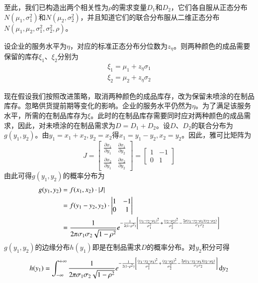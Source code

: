 至此，我们已构造出两个相关性为$\rho$的需求变量$D_1$和$D_2$，它们各自服从正态分布$N(\mu_1,\sigma_1^2)$和$N(\mu_2,\sigma_2^2)$，并且知道它们的联合分布服从二维正态分布$N(\mu_1,\mu_2,\sigma_1^2,\sigma_2^2,\rho)$。

设企业的服务水平为$\eta$，对应的标准正态分布分位数为$z_\eta$。则两种颜色的成品需要保留的库存$\xi_1$、$\xi_2$分别为
\begin{align}
\xi_1 = \mu_1 + z_\eta\sigma_1 \label{eq:成品库存1_相关性}\\
\xi_2 = \mu_2 + z_\eta\sigma_2 \label{eq:成品库存2_相关性}
\end{align}

现在假设我们按照改进策略，取消两种颜色的成品库存，改为保留未喷涂的在制品库存。忽略供货提前期等变化的影响。企业的服务水平仍然为$\eta$。为了满足该服务水平，所需的在制品库存为$\xi$。此时的在制品库存需要同时应对两种颜色的成品需求，因此，对未喷涂的在制品需求为$D=D_1+D_2$。设$D$、$D_2$的联合分布为$g(y_1,y_2)$。由$y_1=x_1+x_2,y_2=x_2$得$x_1=y_1-y_2,x_2=y_2$。因此，雅可比矩阵为
\[
J = \begin{bmatrix}
\frac{\partial x_1}{\partial y_1} & \frac{\partial x_1}{\partial y_2} \\
\frac{\partial x_2}{\partial y_1} & \frac{\partial x_2}{\partial y_2}
\end{bmatrix} = \begin{bmatrix}
1 & -1 \\
0 & 1
\end{bmatrix}
\]
由此可得$g(y_1,y_2)$的概率分布为
\begin{align}
g(y_1,y_2) &= f(x_1,x_2)\cdot\left|J\right| \notag\\
&= f(y_1-y_2,y_2)\cdot
\begin{vmatrix}
1 & -1 \\
0 & 1
\end{vmatrix} \notag\\
&= \frac{1}{2\pi\sigma_1\sigma_2\sqrt{1-\rho^2}}e^{-\frac{1}{2(1-\rho^2)}\left[\frac{(y_1-y_2-\mu_1)^2}{\sigma_1^2}+\frac{(y_2-\mu_2)^2}{\sigma_2^2}-\frac{2\rho(y_1-y_2-\mu_1)(y_2-\mu_2)}{\sigma_1\sigma_2}\right]}
\label{eq:新联合分布_二维正态}
\end{align}
$g(y_1,y_2)$的边缘分布$h(y_1)$即是在制品需求$D$的概率分布。对$y_2$积分可得
\begin{equation}
h(y_1) = \int_{-\infty}^{+\infty}\frac{1}{2\pi\sigma_1\sigma_2\sqrt{1-\rho^2}}e^{-\frac{1}{2(1-\rho^2)}\left[\frac{(y_1-y_2-\mu_1)^2}{\sigma_1^2}+\frac{(y_2-\mu_2)^2}{\sigma_2^2}-\frac{2\rho(y_1-y_2-\mu_1)(y_2-\mu_2)}{\sigma_1\sigma_2}\right]}\operatorname{d\!} y_2
\label{eq:求边缘分布_二维正态}
\end{equation}
